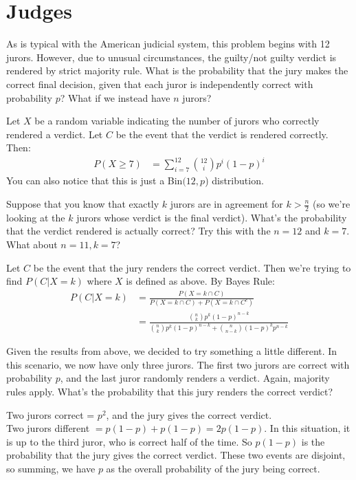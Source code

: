 \documentclass[11pt]{article}
\begin{document}
\section*{Judges}
\begin{exercise}
As is typical with the American judicial system, this problem begins with 12 jurors. However, due to unusual circumstances, the guilty/not guilty verdict is rendered by strict majority rule. What is the probability that the jury makes the correct final decision, given that each juror is independently correct with probability $p$? What if we instead have $n$ jurors?
\end{exercise}
\begin{solution}
Let $X$ be a random variable indicating the number of jurors who correctly rendered a verdict. Let $C$ be the event that the verdict is rendered correctly. Then:
\begin{align*}
P(X \geq 7) &= \sum_{i=7}^{12}{12 \choose i}p^{i}(1-p)^i
\end{align*}
You can also notice that this is just a Bin$(12,p$) distribution.
\end{solution}
\begin{exercise}
Suppose that you know that exactly $k$ jurors are in agreement for $k > \frac{n}{2}$ (so we're looking at the $k$ jurors whose verdict is the final verdict). What's the probability that the verdict rendered is actually correct? Try this with the $n=12$ and $k=7$. What about $n=11, k = 7$?
\end{exercise}
\begin{solution}
Let $C$ be the event that the jury renders the correct verdict. Then we're trying to find $P(C|X = k)$ where $X$ is defined as above. By Bayes Rule:
\begin{align*}
P(C| X = k) &= \frac{P(X = k \cap C)}{P(X=k \cap C) + P(X = k \cap C^c)} \\
&= \frac{{n \choose k}p^k(1-p)^{n-k}}{{n \choose k}p^k(1-p)^{n-k} + {n \choose n - k}(1-p)^kp^{n-k} }
\end{align*}
\end{solution}

\begin{exercise}
Given the results from above, we decided to try something a little different. In this scenario, we now have only three jurors. The first two jurors are correct with probability $p$, and the last juror randomly renders a verdict. Again, majority rules apply. What's the probability that this jury renders the correct verdict?
\end{exercise}
\begin{solution}
Two jurors correct = $p^2$, and the jury gives the correct verdict. \\
Two jurors different $= p(1-p) + p(1-p) = 2p(1-p)$. In this situation, it is up to the third juror, who is correct half of the time. So $p(1-p)$ is the probability that the jury gives the correct verdict. These two events are disjoint, so summing, we have $p$ as the overall probability of the jury being correct.
\end{solution}
\end{document}
